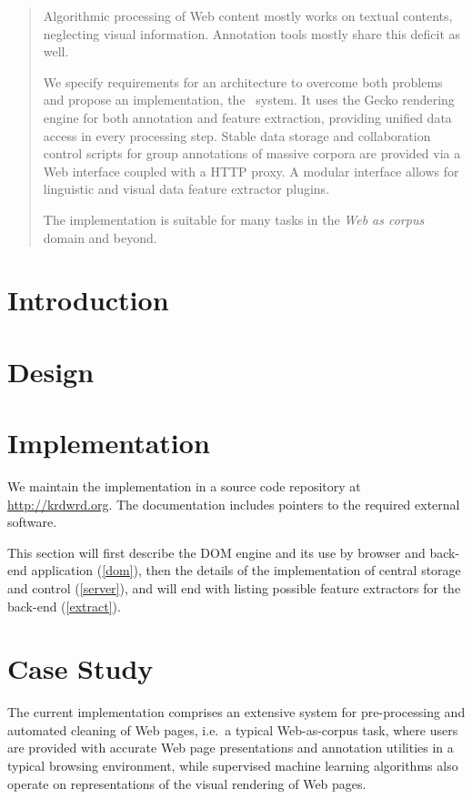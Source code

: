 
\begin{abstract}
Algorithmic processing of Web content mostly works on textual contents, neglecting visual information.
Annotation tools mostly share this deficit as well.

We specify requirements for an architecture to overcome both problems and propose an implementation, the \KrdWrd~system.
It uses the Gecko rendering engine for both annotation and feature extraction, providing unified data access in every processing step.
Stable data storage and collaboration control scripts for group annotations of massive corpora are provided via a Web interface coupled with a HTTP proxy.
A modular interface allows for linguistic and visual data feature extractor plugins.

The implementation is suitable for many tasks in the \textit{Web as corpus} domain and beyond.
\end{abstract}

\section{Introduction}


\section{Design\label{design}}


\section{Implementation\label{impl}}

We maintain the implementation in a source code repository at \url{http://krdwrd.org}.
The documentation includes pointers to the required external software.

This section will first describe the DOM engine and its use by browser and back-end application (\ref{dom}),
then the details of the implementation of central storage and control (\ref{server}), and will end with listing possible feature extractors for the back-end (\ref{extract}).




\section{Case Study\label{casestudy}}

The current implementation comprises an extensive system for pre-processing and automated cleaning of Web pages,
i.e.~a typical Web-as-corpus task, 
where users are provided with accurate Web page presentations and annotation utilities in a typical browsing environment,
while supervised machine learning algorithms also operate on representations of the visual rendering of Web pages. 

